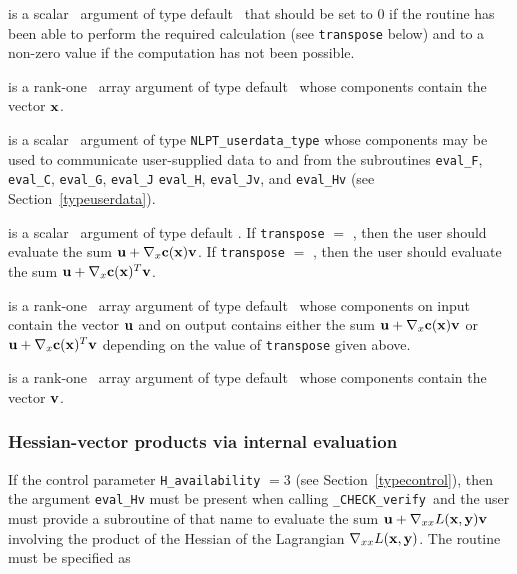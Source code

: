 \documentclass{galahad}
\newcommand{\packagename}{CHECK}
\newcommand{\fullpackagename}{\libraryname\_\packagename}
\newcommand{\solver}{{\tt \fullpackagename\_verify}}
\begin{document}
\begin{description}

 is a scalar \intentout\ argument of type default \integer\
that should be set to 0 if the routine has been able to perform the
required calculation (see {\tt transpose} below) and to a non-zero
value if the computation has not been possible.

 is a rank-one \intentin\ array argument of type default \realdp\
whose components contain the vector ${\mathbf{x}}$.

 is a scalar \intentinout\ argument of type 
{\tt NLPT\_userdata\_type} whose components may be used
to communicate user-supplied data to and from the
subroutines {\tt eval\_F}, {\tt eval\_C}, {\tt eval\_G}, {\tt eval\_J}
{\tt eval\_H}, {\tt eval\_Jv}, and {\tt eval\_Hv} 
(see Section~\ref{typeuserdata}).

 is a scalar \intentin\ argument of type default
\logical.  If {\tt transpose} $=$ \false, then the user should evaluate the
sum ${\mathbf{u}} + \nabla_x {\mathbf{c}}({\mathbf{x}}) {\mathbf{v}}$. If {\tt transpose} $=$ \true,
then the user should evaluate the sum ${\mathbf{u}} + \nabla_x {\mathbf{c}}({\mathbf{x}})^T {\mathbf{v}}$.   

\ittf{U} is a rank-one \intentinout\ array argument of type default \realdp\
whose components on input contain the vector ${\mathbf{u}}$ and on output contains
either the sum ${\mathbf{u}} + \nabla_x {\mathbf{c}}({\mathbf{x}}) {\mathbf{v}}$ or ${\mathbf{u}} + \nabla_x {\mathbf{c}}({\mathbf{x}})^T
{\mathbf{v}}$ depending on the value of {\tt transpose} given above.

\ittf{V} is a rank-one \intentin\ array argument of type default \realdp\
whose components contain the vector ${\mathbf{v}}$.

\end{description}


\subsubsection{Hessian-vector products via internal evaluation\label{hvfv}}

If the control parameter {\tt H\_availability} $=3$ (see
Section~\ref{typecontrol}), then the argument {\tt eval\_Hv} must be
present when calling \solver\ and the
user must provide a subroutine of that name to evaluate the
sum ${\mathbf{u}} + \nabla_{xx} L({\mathbf{x}},{\mathbf{y}}) {\mathbf{v}}$ involving the
product of the Hessian of the Lagrangian $\nabla_{xx} L({\mathbf{x}},{\mathbf{y}})$.
The routine must be specified as
\end{document}
